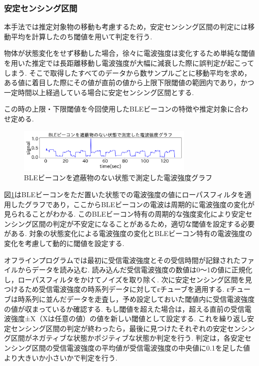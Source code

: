 \documentclass[Japanese]{dicomopapers}
\begin{document}
\subsubsection{安定センシング区間}
本手法では推定対象物の移動も考慮するため，安定センシング区間の判定には移動平均を計算したのち閾値を用いて判定を行う.





物体が状態変化をせず移動した場合，徐々に電波強度は変化するため単純な閾値を用いた推定では長距離移動し電波強度が大幅に減衰した際に誤判定が起こってしまう.
そこで取得したすべてのデータから数サンプルごとに移動平均を求め，ある値に着目した際にその値が直前の値から上限下限閾値の範囲内であり，かつ一定時間以上経過している場合に安定センシング区間とする.


この時の上限・下限閾値を今回使用したBLEビーコンの特徴や推定対象に合わせ定める.

\begin{figure}[b]
    \centering
    \includegraphics[width=8.5cm]{bokoboko.png}
    \caption{BLEビーコンを遮蔽物のない状態で測定した電波強度グラフ}
    \label{nomal-data}
\end{figure}

図\ref{nomal-data}はBLEビーコンをただ置いた状態での電波強度の値にローパスフィルタを適用したグラフであり，ここからBLEビーコンの電波は周期的に電波強度の変化が見られることがわかる.
このBLEビーコン特有の周期的な強度変化により安定センシング区間の判定が不安定になることがあるため，適切な閾値を設定する必要がある.
対象の状態変化による電波強度の変化とBLEビーコン特有の電波強度の変化を考慮して動的に閾値を設定する.

オフラインプログラムでは最初に受信電波強度とその受信時間が記録されたファイルからデータを読み込む.
読み込んだ受信電波強度の数値は0〜1の値に正規化し，ローパスフィルタをかけてノイズを取り除く.
次に安定センシング区間を見つけるため受信電波強度の時系列データに対してεチューブを適用する.
εチューブは時系列に並んだデータを走査し，予め設定しておいた閾値内に受信電波強度の値が収まっているか確認する.
もし閾値を超えた場合は，超える直前の受信電波強度±X（Xは任意の値）の値を新しい閾値として設定する.
これを繰り返し安定センシング区間の判定が終わったら，最後に見つけたそれぞれの安定センシング区間がネガティブな状態かポジティブな状態か判定を行う.
判定は，各安定センシング区間の受信電波強度の平均値が受信電波強度の中央値に0.1を足した値より大きいか小さいかで判定を行う.
\end{document}
